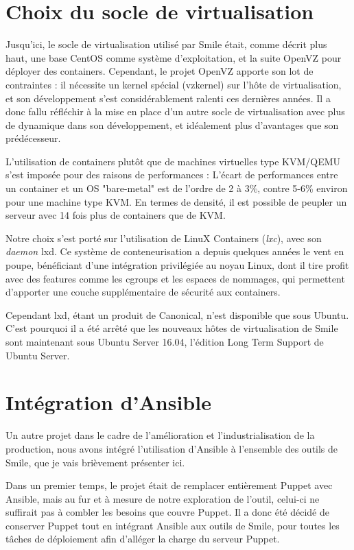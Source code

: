 \documentclass[14 pt]{extreport}
\begin{document}
\section{Choix du socle de virtualisation}

Jusqu'ici, le socle de virtualisation utilisé par Smile était, comme décrit plus haut, une base CentOS comme système d'exploitation, et la suite OpenVZ pour déployer des containers. Cependant, le projet OpenVZ apporte son lot de contraintes : il nécessite un kernel spécial (vzkernel) sur l'hôte de virtualisation, et son développement s'est considérablement ralenti ces dernières années. Il a donc fallu réfléchir à la mise en place d'un autre socle de virtualisation avec plus de dynamique dans son développement, et idéalement plus d'avantages que son prédécesseur.

L'utilisation de containers plutôt que de machines virtuelles type KVM/QEMU s'est imposée pour des raisons de performances : L'écart de performances entre un container et un OS "bare-metal" est de l'ordre de 2 à 3\%, contre 5-6\% environ pour une machine type KVM. En termes de densité, il est possible de peupler un serveur avec 14 fois plus de containers que de KVM.

Notre choix s'est porté sur l'utilisation de LinuX Containers (\emph{lxc}), avec son \emph{daemon} lxd. Ce système de conteneurisation a depuis quelques années le vent en poupe, bénéficiant d'une intégration privilégiée au noyau Linux, dont il tire profit avec des features comme les cgroups et les espaces de nommages, qui permettent d'apporter une couche supplémentaire de sécurité aux containers. 

Cependant lxd, étant un produit de Canonical, n'est disponible que sous Ubuntu. C'est pourquoi il a été arrêté que les nouveaux hôtes de virtualisation de Smile sont maintenant sous Ubuntu Server 16.04, l'édition Long Term Support de Ubuntu Server.

\section{Intégration d'Ansible}

Un autre projet dans le cadre de l'amélioration et l'industrialisation de la production, nous avons intégré l'utilisation d'Ansible à l'ensemble des outils de Smile, que je vais brièvement présenter ici.

Dans un premier temps, le projet était de remplacer entièrement Puppet avec Ansible, mais au fur et à mesure de notre exploration de l'outil, celui-ci ne suffirait pas à combler les besoins que couvre Puppet. Il a donc été décidé de conserver Puppet tout en intégrant Ansible aux outils de Smile, pour toutes les tâches de déploiement afin d'alléger la charge du serveur Puppet.
\end{document}
